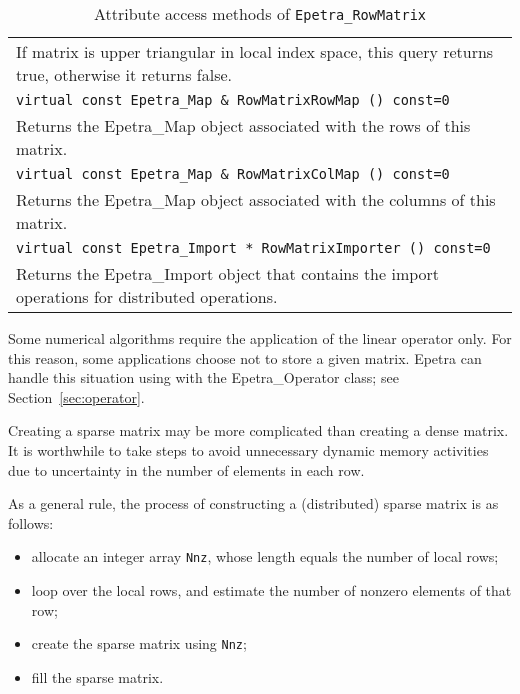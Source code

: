 \begin{table}
\begin{center}
\begin{tabular}{ | p{15cm} | }
If matrix is upper triangular in local index space, this query returns
true, otherwise it returns false. \\
\tt virtual const Epetra\_Map \& 
RowMatrixRowMap () const=0 \\
Returns the Epetra\_Map object associated with the rows of this matrix. \\
\tt virtual const Epetra\_Map \& 
RowMatrixColMap () const=0 \\
Returns the Epetra\_Map object associated with the columns of this
matrix. \\
\tt virtual const Epetra\_Import * 
RowMatrixImporter () const=0 \\
Returns the Epetra\_Import object that contains the import operations for
distributed operations. \\
\hline
\end{tabular}
\caption{Attribute access methods of {\tt Epetra\_RowMatrix}}
\label{tab:row_matrix_atr}
\end{center}
\end{table}



\begin{remark}
  Some numerical algorithms require the application of the linear
  operator only. For this reason, some applications choose not to 
  store a given matrix. Epetra can handle this situation using with the
  Epetra\_Operator class; see Section~\ref{sec:operator}.
\end{remark}

Creating a sparse matrix may be more complicated than creating a dense matrix.
It is worthwhile to take steps to avoid unnecessary dynamic memory activities
due to uncertainty in the number of elements in each row.

As a general rule, the process of constructing a (distributed) sparse
matrix is as follows:
\begin{itemize}
\item allocate an integer array \verb!Nnz!, whose length equals the
  number of local rows;
\item loop over the local rows, and estimate the number of nonzero
  elements of that row;
\item create the sparse matrix using \verb!Nnz!;
\item fill the sparse matrix.
\end{itemize}

